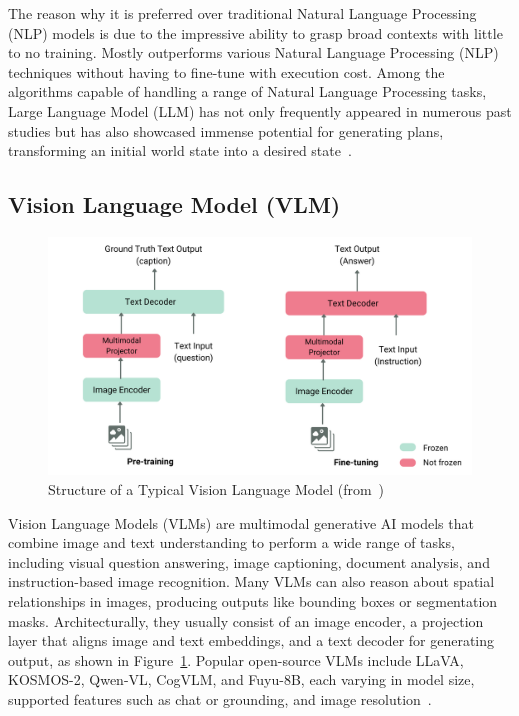 \documentclass[12pt]{extarticle}
\begin{document}
The reason why it is preferred over traditional Natural Language Processing (NLP) models is due to
the impressive ability to grasp broad contexts with little to no training. Mostly outperforms various
Natural Language Processing (NLP) techniques without having to fine-tune with execution cost.
Among the algorithms capable of handling a range of Natural Language Processing tasks, Large
Language Model (LLM) has not only frequently appeared in numerous past studies but has also
showcased immense potential for generating plans, transforming an initial world state into a desired state~\cite{plangenllm}.

\subsection{Vision Language Model (VLM)}
\begin{figure}[htbp]
    \centering
    \includegraphics[width=0.8\linewidth]{images/vlm-structure.png}
    \caption{Structure of a Typical Vision Language Model (from~\cite{huggingface_vlms_2024})}
    \label{fig:vlm-structure}
\end{figure}

Vision Language Models (VLMs) are multimodal generative AI models that combine image and text understanding to perform a wide range of tasks, including visual question answering, image captioning, document analysis, and instruction-based image recognition. Many VLMs can also reason about spatial relationships in images, producing outputs like bounding boxes or segmentation masks. Architecturally, they usually consist of an image encoder, a projection layer that aligns image and text embeddings, and a text decoder for generating output, as shown in Figure~\ref{fig:vlm-structure}. Popular open-source VLMs include LLaVA, KOSMOS-2, Qwen-VL, CogVLM, and Fuyu-8B, each varying in model size, supported features such as chat or grounding, and image resolution~\cite{huggingface_vlms_2024}.
\end{document}
